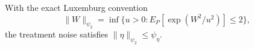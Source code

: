 With the exact Luxemburg convention
\[
 \lVert W\rVert_{\psi_2}
 =\inf\{u>0:E_P[\exp(W^2/u^2)]\le2\},
\]
the treatment noise satisfies \(\lVert\eta\rVert_{\psi_2}\le\psi_{\eta}\).